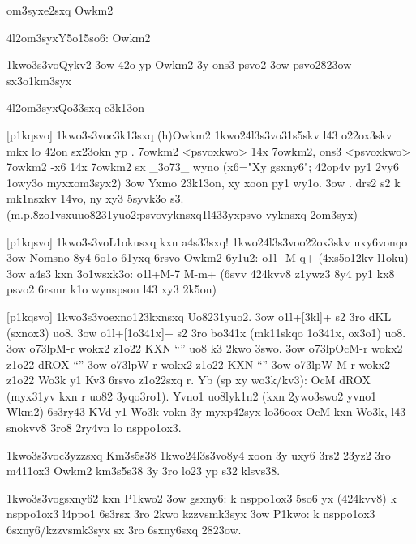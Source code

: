 \2om3syx{e2sxq Owkm2}

\24l2om3syx{Y5o15so6: Owkm2}

 \p1kwo3s3vo{Qykv2}
  \s3ow 42o yp Owkm2 3y ons3 psvo2
  \s3ow psvo2823ow sx3o1km3syx

\24l2om3syx{Qo33sxq c3k13on}

[p1kqsvo]
  \p1kwo3s3vo{c3k13sxq (h)Owkm2}
  \p1kwo24l3s3vo{31s5skv l43 o22ox3skv}
   mkx lo 42on sx23okn yp .
7owkm2 <psvoxkwo>  14x 7owkm2, ons3 <psvoxkwo>
7owkm2 -x6         14x 7owkm2 sx _3o73_ wyno
                   (x6="Xy gsxny6"; 42op4v py1 
                    2vy6 1owy3o myxxom3syx2)
  \s3ow Yxmo 23k13on, xy xoon py1 wy1o.
  \s3ow .  drs2 s2 k mk1nsxkv 14vo,
    ny xy3 5syvk3o s3.
    (m.p.\r8zo1vsxu{uo8231yuo2:psvovyknsxq}{\lokwo1l433yx{psvo-vyknsxq 2om3syx}})


[p1kqsvo]
  \p1kwo3s3vo{L1okusxq kxn a4s33sxq!}
  \p1kwo24l3s3vo{o22ox3skv uxy6vonqo}
  \s3ow Nomsno 8y4 6o1o 61yxq 6rsvo Owkm2 6y1u2: \5o1l+M-q+  (4xs5o12kv l1oku)
  \s3ow a4s3 kxn 3o1wsxk3o: \5o1l+M-7 M-m+ (6svv 424kvv8 z1ywz3 8y4
    py1 kx8 psvo2 6rsmr k1o wynspson l43 xy3 2k5on)


[p1kqsvo]
  \p1kwo3s3vo{exno123kxnsxq Uo8231yuo2.}
  \s3ow \5o1l+[3kl]+ s2 3ro dKL (sxnox3) uo8.
  \s3ow \5o1l+[1o341x]+ s2 3ro bo341x (mk11skqo 1o341x, ox3o1) uo8.
  \s3ow \3o73lp{M-r} wokx2 z1o22  KXN ``'' uo8 k3 2kwo 3swo.
  \s3ow \3o73lp{OcM-r} wokx2 z1o22  dROX ``''
  \s3ow \3o73lp{W-r} wokx2 z1o22  KXN ``''
  \s3ow \3o73lp{W-M-r} wokx2 z1o22 Wo3k y1 Kv3 6rsvo z1o22sxq r.  Yb
    (sp xy wo3k/kv3): OcM dROX (myx31yv kxn r uo82 3yqo3ro1).
  Yvno1 uo8lyk1n2 (kxn 2ywo3swo2 yvno1 Wkm2) 6s3ry43 KVd y1 Wo3k vokn
  3y myxp42syx lo36oox OcM kxn Wo3k, l43 snokvv8 3ro8 2ry4vn lo nsppo1ox3.

 \p1kwo3s3vo{c3yzzsxq Km3s5s38}
  \p1kwo24l3s3vo{8y4 xoon 3y uxy6 3rs2}
   23yz2 3ro m411ox3 Owkm2 km3s5s38 3y 3ro lo23 yp s32 klsvs38.

  \p1kwo3s3vo{gsxny62 kxn P1kwo2}
  \s3ow gsxny6:  k nsppo1ox3 5so6 yx (424kvv8) k nsppo1ox3 l4ppo1 6s3rsx 3ro 2kwo kzzvsmk3syx
  \s3ow P1kwo: k nsppo1ox3 6sxny6/kzzvsmk3syx sx 3ro 6sxny6sxq 2823ow.

